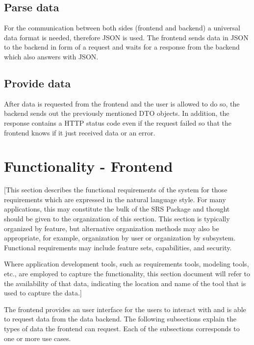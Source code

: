 \documentclass[a4paper,12pt,chapterprefix=false,bibliography=totoc,listof=totoc,]{scrreprt}
\begin{document}
\subsection{{\color{magenta} Parse data}}
{\color{magenta}
For the communication between both sides (frontend and backend) a universal data format is needed, therefore JSON is used. The frontend sends data in JSON to the backend in form of a request and waits for a response from the backend which also answers with JSON.
}

\subsection{{\color{magenta} Provide data}}
{\color{magenta}
After data is requested from the frontend and the user is allowed to do so, the backend sends out the previously mentioned DTO objects. In addition, the response contains a HTTP status code even if the request failed so that the frontend knows if it just received data or an error.
}

\section{Functionality - Frontend}
{\color{blue} [This section describes the functional requirements of the system for those requirements which are expressed in the natural language style. For many applications, this may constitute the bulk of the SRS Package and thought should be given to the organization of this section. This section is typically organized by feature, but alternative organization methods may also be appropriate, for example, organization by user or organization by subsystem.  Functional requirements may include feature sets, capabilities, and security.

Where application development tools, such as requirements tools, modeling tools, etc., are employed to capture the functionality, this section document will refer to the availability of that data, indicating the location and name of the tool that is used to capture the data.]}

{\color{magenta}
The frontend provides an user interface for the users to interact with and is able to request data from the data backend. The following subsections explain the types of data the frontend can request. Each of the subsections corresponds to one or more use cases.
}

\end{document}
